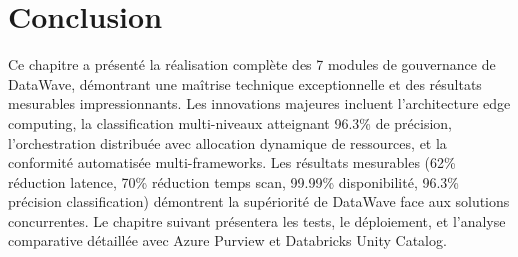 \section*{Conclusion}

Ce chapitre a présenté la réalisation complète des 7 modules de gouvernance de DataWave, démontrant une maîtrise technique exceptionnelle et des résultats mesurables impressionnants. Les innovations majeures incluent l'architecture edge computing, la classification multi-niveaux atteignant 96.3\% de précision, l'orchestration distribuée avec allocation dynamique de ressources, et la conformité automatisée multi-frameworks. Les résultats mesurables (62\% réduction latence, 70\% réduction temps scan, 99.99\% disponibilité, 96.3\% précision classification) démontrent la supériorité de DataWave face aux solutions concurrentes. Le chapitre suivant présentera les tests, le déploiement, et l'analyse comparative détaillée avec Azure Purview et Databricks Unity Catalog.
